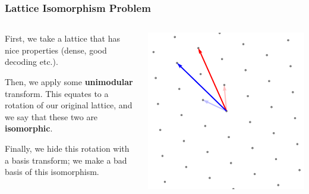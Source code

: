 \documentclass[
aspectratio=169, %
t, %
onlytextwidth, %
10pt, %
]{beamer}
\begin{document}
\begin{frame}
    \frametitle{Lattice Isomorphism Problem}
    \begin{columns}[T]
        \begin{column}{0.48\linewidth}
            First, we take a lattice that has nice properties (dense, good decoding etc.).

            Then, we apply some \textbf{unimodular} transform. This equates to a rotation of our original lattice, and we say that these two are \textbf{isomorphic}.

            Finally, we hide this rotation with a basis transform; we make a bad basis of this isomorphism.
        \end{column}
        \begin{column}{0.48\linewidth}
            \includegraphics[width=\linewidth]{a2_rotated_basis_change.png}
        \end{column}
    \end{columns}
\end{frame}

\end{document}
